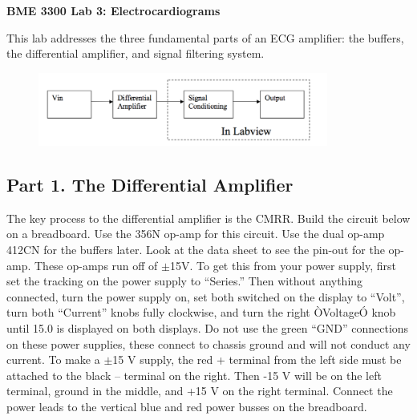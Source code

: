 \documentclass[12pt]{article}
\begin{document}
\thispagestyle{plain} %





\begin{center}
\bigskip

\textbf{BME 3300 Lab 3: Electrocardiograms} \medskip

\end{center}

\bigskip
This lab addresses the three fundamental parts of an ECG amplifier: the buffers, the differential amplifier, and signal filtering system.
\vspace{-0.25cm}
\begin{figure}[!h]
\begin{center}
\includegraphics[width=0.85\textwidth,trim=0 0 0 0,clip=false]{figures/flowchart.png}
\end{center}
\end{figure}
\vspace{-1.5cm}
\subsection*{Part 1. The Differential Amplifier}
The key process to the differential amplifier is the CMRR. 
Build the circuit below on a breadboard. 
Use the 356N op-amp for this circuit. 
Use the dual op-amp 412CN for the buffers later. 
Look at the data sheet to see the pin-out for the op-amp. 
These op-amps run off of $\pm$15V. 
To get this from your power supply, first set the tracking on the power supply to ``Series.'' 
Then without anything connected, turn the power supply on, set both switched on the display to ``Volt'', 
turn both ``Current'' knobs fully clockwise, and turn the right ÒVoltageÓ knob until 15.0 is displayed on both displays. 
Do not use the green ``GND'' connections on these power supplies, these connect to chassis ground and will not conduct any current. 
To make a $\pm$15 V supply, the red + terminal from the left side must be attached to the black -- terminal on the right. 
Then -15 V will be on the left terminal, ground in the middle, and +15 V on the right terminal. 
Connect the power leads to the vertical blue and red power busses on the breadboard.
\end{document}
